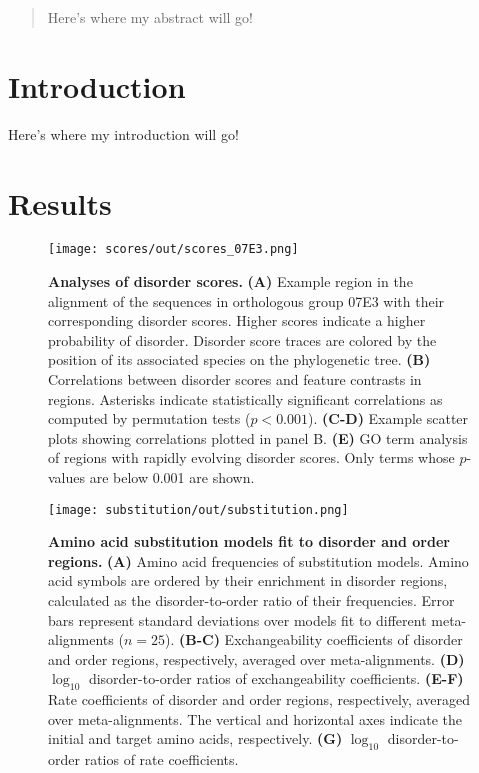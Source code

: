 \begin{abstract}
\noindent
Here's where my abstract will go!
\end{abstract}

\section{Introduction}
Here's where my introduction will go!

\section{Results}
\begin{figure}[h!]
\texttt{[image: scores/out/scores\_07E3.png]}
\centering
\caption{\textbf{Analyses of disorder scores.}
\textbf{(A)} Example region in the alignment of the sequences in orthologous group 07E3 with their corresponding disorder scores. Higher scores indicate a higher probability of disorder. Disorder score traces are colored by the position of its associated species on the phylogenetic tree. \textbf{(B)} Correlations between disorder scores and feature contrasts in regions. Asterisks indicate statistically significant correlations as computed by permutation tests ($p < 0.001$). \textbf{(C-D)} Example scatter plots showing correlations plotted in panel B. \textbf{(E)} GO term analysis of regions with rapidly evolving disorder scores. Only terms whose $p$-values are below 0.001 are shown.}
\label{fig:scores}
\end{figure}

\begin{figure}[h!]
\texttt{[image: substitution/out/substitution.png]}
\centering
\caption{\textbf{Amino acid substitution models fit to disorder and order regions.}
\textbf{(A)} Amino acid frequencies of substitution models. Amino acid symbols are ordered by their enrichment in disorder regions, calculated as the disorder-to-order ratio of their frequencies. Error bars represent standard deviations over models fit to different meta-alignments ($n = 25$). \textbf{(B-C)} Exchangeability coefficients of disorder and order regions, respectively, averaged over meta-alignments. \textbf{(D)} $\log_{10}$ disorder-to-order ratios of exchangeability coefficients. \textbf{(E-F)} Rate coefficients of disorder and order regions, respectively, averaged over meta-alignments. The vertical and horizontal axes indicate the initial and target amino acids, respectively. \textbf{(G)} $\log_{10}$ disorder-to-order ratios of rate coefficients.}
\label{fig:substitution}
\end{figure}

